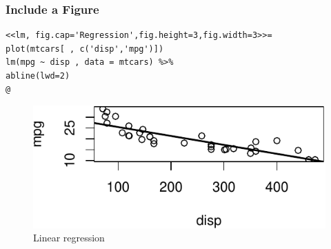 \documentclass[10pt]{beamer}\usepackage[]{graphicx}\usepackage[]{color}
\makeatletter
\def\maxwidth{ %
  \ifdim\Gin@nat@width>\linewidth
    \linewidth
  \else
    \Gin@nat@width
  \fi
}
\newenvironment{kframe}{%
 \def\at@end@of@kframe{}%
 \ifinner\ifhmode%
  \def\at@end@of@kframe{\end{minipage}}%
  \begin{minipage}{\columnwidth}%
 \fi\fi%
 \def\FrameCommand##1{\hskip\@totalleftmargin \hskip-\fboxsep
 \colorbox{shadecolor}{##1}\hskip-\fboxsep
     \hskip-\linewidth \hskip-\@totalleftmargin \hskip\columnwidth}%
 \MakeFramed {\advance\hsize-\width
   \@totalleftmargin\z@ \linewidth\hsize
   \@setminipage}}%
 {\par\unskip\endMakeFramed%
 \at@end@of@kframe}
\newenvironment{knitrout}{}{} %
\makeatother
\begin{document}
\begin{frame}[fragile]
\frametitle{Include a Figure}
\scriptsize
\begin{knitrout}\footnotesize
{}\color{fgcolor}\begin{kframe}
\begin{verbatim}
<<lm, fig.cap='Regression',fig.height=3,fig.width=3>>=
plot(mtcars[ , c('disp','mpg')])
lm(mpg ~ disp , data = mtcars) %>%
abline(lwd=2)
@
\end{verbatim}
\end{kframe}
\end{knitrout}
\begin{knitrout}\footnotesize
{}\color{fgcolor}\begin{figure}

{\centering \includegraphics[width=\maxwidth]{figure/slr7-1} 

}

\caption[Linear regression]{Linear regression}\label{fig:slr7}
\end{figure}


\end{knitrout}
\end{frame}
\end{document}
